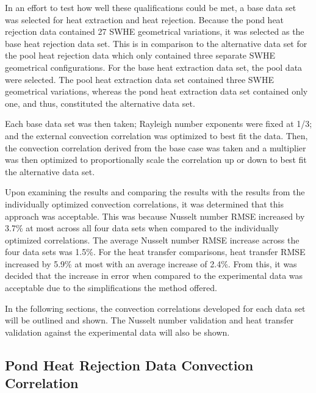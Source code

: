 In an effort to test how well these qualifications could be met, a base data set was selected for heat extraction and heat rejection. Because the pond heat rejection data contained 27 SWHE geometrical variations, it was selected as the base heat rejection data set. This is in comparison to the alternative data set for the pool heat rejection data which only contained three separate SWHE geometrical configurations. For the base heat extraction data set, the pool data were selected. The pool heat extraction data set contained three SWHE geometrical variations, whereas the pond heat extraction data set contained only one, and thus, constituted the alternative data set.

Each base data set was then taken; Rayleigh number exponents were fixed at 1/3; and the external convection correlation was optimized to best fit the data. Then, the convection correlation derived from the base case was taken and a multiplier was then optimized to proportionally scale the correlation up or down to best fit the alternative data set.

Upon examining the results and comparing the results with the results from the individually optimized convection correlations, it was determined that this approach was acceptable. This was because Nusselt number RMSE increased by 3.7\% at most across all four data sets when compared to the individually optimized correlations. The average Nusselt number RMSE increase across the four data sets was 1.5\%. For the heat transfer comparisons, heat transfer RMSE increased by 5.9\% at most with an average increase of 2.4\%. From this, it was decided that the increase in error when compared to the experimental data was acceptable due to the simplifications the method offered.

In the following sections, the convection correlations developed for each data set will be outlined and shown. The Nusselt number validation and heat transfer validation against the experimental data will also be shown.


\subsection{Pond Heat Rejection Data Convection Correlation}
\label{subsec:Correlation:PondHeatRej}
		
